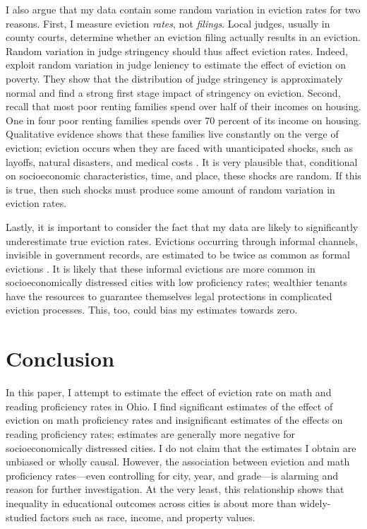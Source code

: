 \documentclass[12pt]{article}
\begin{document}
I also argue that my data contain some random variation in eviction rates for two reasons. First, I measure eviction \textit{rates}, not \textit{filings}. Local judges, usually in county courts, determine whether an eviction filing actually results in an eviction. Random variation in judge stringency should thus affect eviction rates. Indeed, \cite{humphries_does_2019} exploit random variation in judge leniency to estimate the effect of eviction on poverty. They show that the distribution of judge stringency is approximately normal and find a strong first stage impact of stringency on eviction. Second, recall that most poor renting families spend over half of their incomes on housing. One in four poor renting families spends over 70 percent of its income on housing. Qualitative evidence shows that these families live constantly on the verge of eviction; eviction occurs when they are faced with unanticipated shocks, such as layoffs, natural disasters, and medical costs \cite{desmond_evicted:_2017}. It is very plausible that, conditional on socioeconomic characteristics, time, and place, these shocks are random. If this is true, then such shocks must produce some amount of random variation in eviction rates.


Lastly, it is important to consider the fact that my data are likely to significantly underestimate true eviction rates. Evictions occurring through informal channels, invisible in government records, are estimated to be twice as common as formal evictions \citep{desmond_forced_2015}. It is likely that these informal evictions are more common in socioeconomically distressed cities with low proficiency rates; wealthier tenants have the resources to guarantee themselves legal protections in complicated eviction processes. This, too, could bias my estimates towards zero. 

\section{Conclusion} \label{sec:conclusion}
In this paper, I attempt to estimate the effect of eviction rate on math and reading proficiency rates in Ohio. I find significant estimates of the effect of eviction on math proficiency rates and insignificant estimates of the effects on reading proficiency rates; estimates are generally more negative for socioeconomically distressed cities. I do not claim that the estimates I obtain are unbiased or wholly causal. However, the association between eviction and math proficiency rates—even controlling for city, year, and grade—is alarming and reason for further investigation. At the very least, this relationship shows that inequality in educational outcomes across cities is about more than widely-studied factors such as race, income, and property values.
\end{document}
